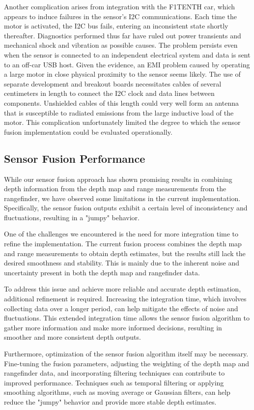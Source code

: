 \documentclass[conference]{IEEEtran}
\begin{document}
Another complication arises from integration with the F1TENTH car, which
appears to induce failures in the sensor's I2C communications. Each time the
motor is activated, the I2C bus fails, entering an inconsistent state shortly
thereafter. Diagnostics performed thus far have ruled out power transients and
mechanical shock and vibration as possible causes. The problem persists even
when the sensor is connected to an independent electrical system and data is
sent to an off-car USB host. Given the evidence, an EMI problem caused by
operating a large motor in close physical proximity to the sensor seems likely.
The use of separate development and breakout boards necessitates cables of
several centimeters in length to connect the I2C clock and data lines between
components. Unshielded cables of this length could very well form an antenna
that is susceptible to radiated emissions from the large inductive load of the
motor. This complication unfortunately limited the degree to which the sensor
fusion implementation could be evaluated operationally.

\subsection{Sensor Fusion Performance}
While our sensor fusion approach has shown promising results in combining depth information from the depth map and range measurements from the rangefinder, we have observed some limitations in the current implementation. Specifically, the sensor fusion outputs exhibit a certain level of inconsistency and fluctuations, resulting in a "jumpy" behavior.

One of the challenges we encountered is the need for more integration time to refine the implementation. The current fusion process combines the depth map and range measurements to obtain depth estimates, but the results still lack the desired smoothness and stability. This is mainly due to the inherent noise and uncertainty present in both the depth map and rangefinder data.

To address this issue and achieve more reliable and accurate depth estimation, additional refinement is required. Increasing the integration time, which involves collecting data over a longer period, can help mitigate the effects of noise and fluctuations. This extended integration time allows the sensor fusion algorithm to gather more information and make more informed decisions, resulting in smoother and more consistent depth outputs.

Furthermore, optimization of the sensor fusion algorithm itself may be necessary. Fine-tuning the fusion parameters, adjusting the weighting of the depth map and rangefinder data, and incorporating filtering techniques can contribute to improved performance. Techniques such as temporal filtering or applying smoothing algorithms, such as moving average or Gaussian filters, can help reduce the "jumpy" behavior and provide more stable depth estimates.
\end{document}

